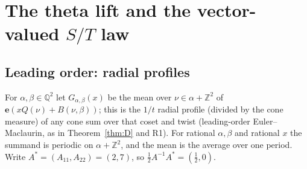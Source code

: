 \documentclass[11pt]{article}
\theoremstyle{definition}
\theoremstyle{plain}
\newcommand{\Q}{\mathbb{Q}}
\newcommand{\Z}{\mathbb{Z}}
\newcommand{\e}{\mathbf{e}}
\begin{document}
\section{The theta lift and the vector-valued $S/T$ law}\label{sec:lift}

\subsection{Leading order: radial profiles}\label{sec:lead}
For $\alpha,\beta\in\Q^2$ let $G_{\alpha,\beta}(x)$ be the mean over $\nu\in\alpha+\Z^2$ of $\e(xQ(\nu)+B(\nu,\beta))$; this is the $1/t$
radial profile (divided by the cone measure) of any cone sum over that coset and twist (leading-order Euler--Maclaurin, as in
Theorem~\ref{thm:D} and R1). For rational $\alpha,\beta$ and rational $x$ the summand is periodic on $\alpha+\Z^2$, and the mean is the average over
one period. Write $A^*=(A_{11},A_{22})=(2,7)$, so $\tfrac12A^{-1}A^*=(\tfrac12,0)$.
\end{document}
